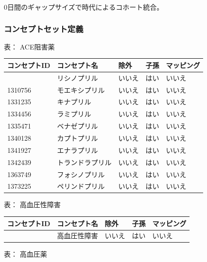 \documentclass[
  11pt]{book}
\theoremstyle{definition}
\theoremstyle{definition}
\theoremstyle{definition}
\theoremstyle{definition}
\theoremstyle{remark}
\begin{document}
0日間のギャップサイズで時代によるコホート統合。

\subsubsection*{コンセプトセット定義}\label{ux30b3ux30f3ux30bbux30d7ux30c8ux30bbux30c3ux30c8ux5b9aux7fa9-1}

表： \label{tab:aceInhibitorsMono} ACE阻害薬

\begin{longtable}[]{@{}lllll@{}}
\toprule\noalign{}
コンセプトID & コンセプト名 & 除外 & 子孫 & マッピング \\
\midrule\noalign{}
\endhead
\bottomrule\noalign{}
\endlastfoot
1308216 & リシノプリル & いいえ & はい & いいえ \\
1310756 & モエキシプリル & いいえ & はい & いいえ \\
1331235 & キナプリル & いいえ & はい & いいえ \\
1334456 & ラミプリル & いいえ & はい & いいえ \\
1335471 & ベナゼプリル & いいえ & はい & いいえ \\
1340128 & カプトプリル & いいえ & はい & いいえ \\
1341927 & エナラプリル & いいえ & はい & いいえ \\
1342439 & トランドラプリル & いいえ & はい & いいえ \\
1363749 & フォシノプリル & いいえ & はい & いいえ \\
1373225 & ペリンドプリル & いいえ & はい & いいえ \\
\end{longtable}

表： \label{tab:hypertensionAceMono} 高血圧性障害

\begin{longtable}[]{@{}lllll@{}}
\toprule\noalign{}
コンセプトID & コンセプト名 & 除外 & 子孫 & マッピング \\
\midrule\noalign{}
\endhead
\bottomrule\noalign{}
\endlastfoot
316866 & 高血圧性障害 & いいえ & はい & いいえ \\
\end{longtable}

表： \label{tab:htnDrugsAceMono} 高血圧薬
\end{document}
